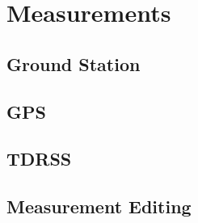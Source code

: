 \section{Measurements}

%

\subsection{Ground Station}

\subsection{GPS}

\subsection{TDRSS}

\subsection{Measurement Editing}
